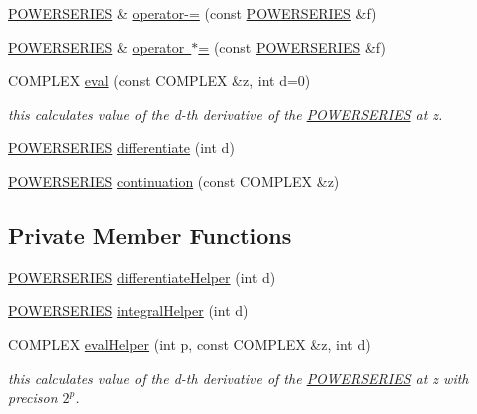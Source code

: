 \begin{DoxyCompactItemize}
\item 
\mbox{\hyperlink{classi_r_r_a_m_1_1_p_o_w_e_r_s_e_r_i_e_s}{P\+O\+W\+E\+R\+S\+E\+R\+I\+ES}} \& \mbox{\hyperlink{classi_r_r_a_m_1_1_p_o_w_e_r_s_e_r_i_e_s_a8dc7a790d186b81261d7f0ce97d11b9c}{operator-\/=}} (const \mbox{\hyperlink{classi_r_r_a_m_1_1_p_o_w_e_r_s_e_r_i_e_s}{P\+O\+W\+E\+R\+S\+E\+R\+I\+ES}} \&f)
\item 
\mbox{\hyperlink{classi_r_r_a_m_1_1_p_o_w_e_r_s_e_r_i_e_s}{P\+O\+W\+E\+R\+S\+E\+R\+I\+ES}} \& \mbox{\hyperlink{classi_r_r_a_m_1_1_p_o_w_e_r_s_e_r_i_e_s_a7258b7ba6ec2ec53c1cf4b0861852ac4}{operator $\ast$=}} (const \mbox{\hyperlink{classi_r_r_a_m_1_1_p_o_w_e_r_s_e_r_i_e_s}{P\+O\+W\+E\+R\+S\+E\+R\+I\+ES}} \&f)
\item 
C\+O\+M\+P\+L\+EX \mbox{\hyperlink{classi_r_r_a_m_1_1_p_o_w_e_r_s_e_r_i_e_s_afa6ce6efb483f1bca0b11f0a74a40a29}{eval}} (const C\+O\+M\+P\+L\+EX \&z, int d=0)
\begin{DoxyCompactList}\small\item\em this calculates value of the d-\/th derivative of the \mbox{\hyperlink{classi_r_r_a_m_1_1_p_o_w_e_r_s_e_r_i_e_s}{P\+O\+W\+E\+R\+S\+E\+R\+I\+ES}} at z. \end{DoxyCompactList}\item 
\mbox{\hyperlink{classi_r_r_a_m_1_1_p_o_w_e_r_s_e_r_i_e_s}{P\+O\+W\+E\+R\+S\+E\+R\+I\+ES}} \mbox{\hyperlink{classi_r_r_a_m_1_1_p_o_w_e_r_s_e_r_i_e_s_a91f30d704946e517a2cdc9680c5c9ed2}{differentiate}} (int d)
\item 
\mbox{\hyperlink{classi_r_r_a_m_1_1_p_o_w_e_r_s_e_r_i_e_s}{P\+O\+W\+E\+R\+S\+E\+R\+I\+ES}} \mbox{\hyperlink{classi_r_r_a_m_1_1_p_o_w_e_r_s_e_r_i_e_s_a7af324b04aa41061f316de8eb48a7b36}{continuation}} (const C\+O\+M\+P\+L\+EX \&z)
\end{DoxyCompactItemize}
\subsection*{Private Member Functions}
\begin{DoxyCompactItemize}
\item 
\mbox{\hyperlink{classi_r_r_a_m_1_1_p_o_w_e_r_s_e_r_i_e_s}{P\+O\+W\+E\+R\+S\+E\+R\+I\+ES}} \mbox{\hyperlink{classi_r_r_a_m_1_1_p_o_w_e_r_s_e_r_i_e_s_acf682244ff638e650eb0ba6509f8de9c}{differentiate\+Helper}} (int d)
\item 
\mbox{\hyperlink{classi_r_r_a_m_1_1_p_o_w_e_r_s_e_r_i_e_s}{P\+O\+W\+E\+R\+S\+E\+R\+I\+ES}} \mbox{\hyperlink{classi_r_r_a_m_1_1_p_o_w_e_r_s_e_r_i_e_s_abf4e4538df8e5e215e8530f494c1d429}{integral\+Helper}} (int d)
\item 
C\+O\+M\+P\+L\+EX \mbox{\hyperlink{classi_r_r_a_m_1_1_p_o_w_e_r_s_e_r_i_e_s_a04a9cbaea8ae39ba9caa9be2e38c72ef}{eval\+Helper}} (int p, const C\+O\+M\+P\+L\+EX \&z, int d)
\begin{DoxyCompactList}\small\item\em this calculates value of the d-\/th derivative of the \mbox{\hyperlink{classi_r_r_a_m_1_1_p_o_w_e_r_s_e_r_i_e_s}{P\+O\+W\+E\+R\+S\+E\+R\+I\+ES}} at z with precison $2^p$. \end{DoxyCompactList}\end{DoxyCompactItemize}
